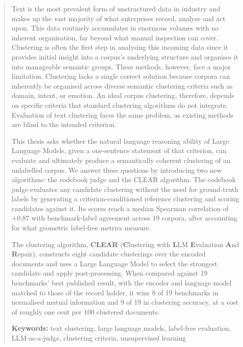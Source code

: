\documentclass[11pt,a4paper,oneside]{report}
\begin{document}
\begin{abstract}

Text is the most prevalent form of unstructured data in industry and makes up the vast majority of what enterprises record, analyse and act upon. This data routinely accumulates in enormous volumes with no inherent organisation, far beyond what manual inspection can cover. Clustering is often the first step in analysing this incoming data since it provides initial insight into a corpus's underlying structure and organises it into manageable semantic groups. These methods, however, face a major limitation. Clustering lacks a single correct solution because corpora can inherently be organised across diverse semantic clustering criteria such as domain, intent, or emotion. An ideal corpus clustering, therefore, depends on specific criteria that standard clustering algorithms do not integrate. Evaluation of text clustering faces the same problem, as existing methods are blind to the intended criterion.

This thesis asks whether the natural language reasoning ability of Large Language Models, given a one-sentence statement of that criterion, can evaluate and ultimately produce a semantically coherent clustering of an unlabelled corpus. We answer these questions by introducing two new algorithms: the codebook judge and the CLEAR algorithm. The codebook judge evaluates any candidate clustering without the need for ground-truth labels by generating a criterion-conditioned reference clustering and scoring candidates against it. Its scores reach a median Spearman correlation of $+0.87$ with benchmark-label agreement across 19 corpora, after accounting for what geometric label-free metrics measure.

The clustering algorithm, \textbf{CLEAR} (\textbf{C}lustering with \textbf{L}LM \textbf{E}valuation \textbf{A}nd \textbf{R}epair), constructs eight candidate clusterings over the encoded documents and uses a Large Language Model to select the strongest candidate and apply post-processing. When compared against 19 benchmarks' best published result, with the encoder and language model matched to those of the record holder, it wins 8 of 19 benchmarks in normalised mutual information and 9 of 19 in clustering accuracy, at a cost of roughly one cent per 100 clustered documents.


\vspace{\baselineskip}
\noindent\textbf{Keywords:} text clustering, large language models, label-free evaluation, LLM-as-a-judge, clustering criteria, unsupervised learning
\end{abstract}
\end{document}
